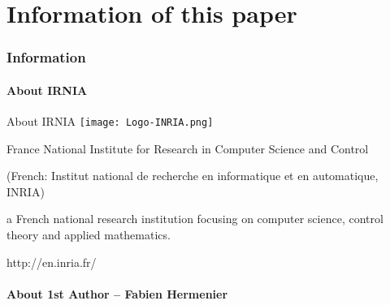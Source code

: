 


\part{Information of this paper} 
\section{Information} 
\subsection{About IRNIA} 

\begin{frame}{About IRNIA}
\texttt{[image: Logo-INRIA.png]} 

France National Institute for Research in Computer Science and Control
 
\pause{}
(French: Institut national de recherche en informatique et en automatique, INRIA)

\pause{}

\br
a French national research institution focusing on computer science, control 
theory and applied mathematics.
\pause{}

\br
http://en.inria.fr/
\end{frame}

\subsection{About 1st Author -- Fabien Hermenier} 


